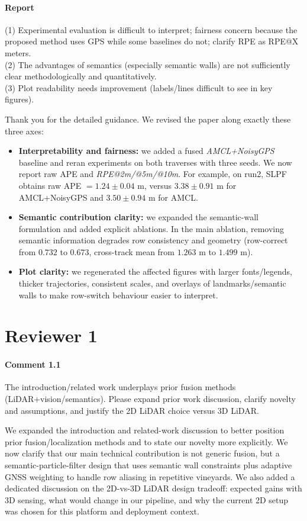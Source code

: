 \documentclass[a4paper]{article}
\def\answer#1#2{\begin{tcolorbox}[width=\textwidth,colback={white},title={\textbf{Answer
 #1}},colbacktitle=answerBoxColor,coltitle=white] #2 \end{tcolorbox} }
\begin{document}
\paragraph{Report}
{\color{commentColor}
(1) Experimental evaluation is difficult to interpret; fairness concern because the proposed method uses GPS while some baselines do not; clarify RPE as RPE@X meters.\\
(2) The advantages of semantics (especially semantic walls) are not sufficiently clear methodologically and quantitatively.\\
(3) Plot readability needs improvement (labels/lines difficult to see in key figures).
}

\vspace{8pt}
\answer{to Associate Editor}{
Thank you for the detailed guidance. We revised the paper along exactly these three axes:
\begin{itemize}
  \item \textbf{Interpretability and fairness:} we added a fused \emph{AMCL+NoisyGPS} baseline and reran experiments on both traverses with three seeds. We now report raw APE and \emph{RPE@2m/@5m/@10m}. For example, on run2, SLPF obtains raw APE $=1.24\pm0.04$ m, versus $3.38\pm0.91$ m for AMCL+NoisyGPS and $3.50\pm0.94$ m for AMCL.
  \item \textbf{Semantic contribution clarity:} we expanded the semantic-wall formulation and added explicit ablations. In the main ablation, removing semantic information degrades row consistency and geometry (row-correct from $0.732$ to $0.673$, cross-track mean from $1.263$ m to $1.499$ m).
  \item \textbf{Plot clarity:} we regenerated the affected figures with larger fonts/legends, thicker trajectories, consistent scales, and overlays of landmarks/semantic walls to make row-switch behaviour easier to interpret.
\end{itemize}
}

\newpage
\section*{Reviewer 1}

\paragraph{Comment 1.1}
{\color{commentColor}
The introduction/related work underplays prior fusion methods (LiDAR+vision/semantics). Please expand prior work discussion, clarify novelty and assumptions, and justify the 2D LiDAR choice versus 3D LiDAR.
}
\answer{1.1}{
We expanded the introduction and related-work discussion to better position prior fusion/localization methods and to state our novelty more explicitly.
We now clarify that our main technical contribution is not generic fusion, but a semantic-particle-filter design that uses semantic wall constraints plus adaptive GNSS weighting to handle row aliasing in repetitive vineyards.
We also added a dedicated discussion on the 2D-vs-3D LiDAR design tradeoff: expected gains with 3D sensing, what would change in our pipeline, and why the current 2D setup was chosen for this platform and deployment context.
}
\end{document}
